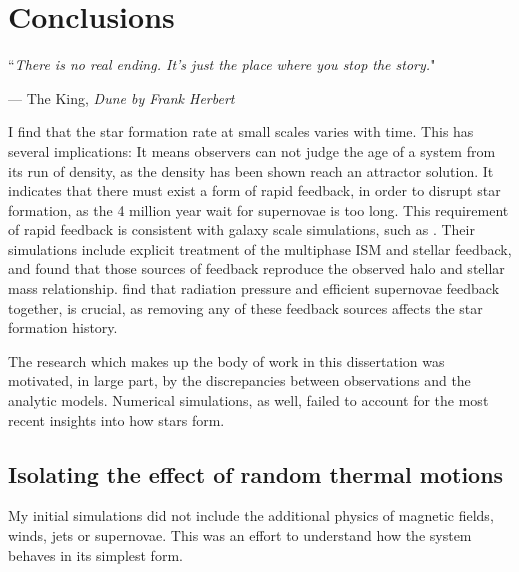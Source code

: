 \documentclass[../dissertation.tex]{subfiles}
\begin{document}
\chapter{Conclusions}
\label{ch:conclusions}

\singlespace
\epigraph{``\emph{There is no real ending. It's just the place where you stop the story.}"}{--- \textup{The King}, \textit{Dune by Frank Herbert}}

\dblspace

I find that the star formation rate at small scales varies with time.
This has several implications: It means observers can not judge the age of a system from its run of density,
as the density has been shown reach an attractor solution.
It indicates that there must exist a form of rapid feedback, in order to disrupt star formation, as the 4 million year wait for supernovae is too long.
This requirement of rapid feedback is consistent with galaxy scale simulations, such as \citet{2014MNRAS.445..581H}. 
Their simulations include explicit treatment of the multiphase ISM and stellar feedback, and
\citet{2014MNRAS.445..581H} found that those sources of feedback reproduce the observed halo and stellar mass relationship.
\citet{2015ApJ...804...18A} find that radiation pressure and efficient supernovae feedback together, is crucial, as removing any of these feedback sources affects
the star formation history.

The research which makes up the body of work in this dissertation was motivated, in large part, 
by the discrepancies between observations and the analytic models. 
Numerical simulations, as well, failed to account for the most recent insights into how stars form. 

\section{Isolating the effect of random thermal motions}
My initial simulations did not include the additional physics of magnetic fields, winds, jets or supernovae. 
This was an effort to understand how the system behaves in its simplest form.
\end{document}
